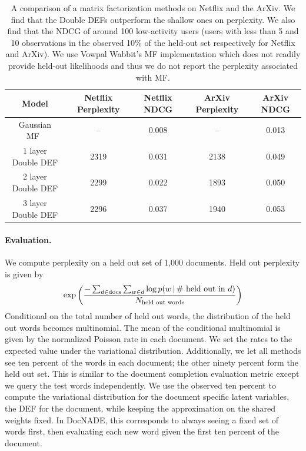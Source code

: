 \documentclass[twoside]{article}
\begin{document}
\begin{table}
\centering
\begin{tabular}{|c | c | c | c | c |}
\hline
Model & Netflix Perplexity & Netflix NDCG & ArXiv Perplexity & ArXiv NDCG  \\
\hline
 Gaussian MF~\cite{Salakhutdinov:2008a}  & -- & 0.008 & --  & 0.013 \\\hline
 1 layer Double DEF & 2319  & 0.031 & 2138  & 0.049 \\ 
 2 layer Double DEF & 2299 & 0.022 & 1893  & 0.050 \\
 3 layer Double DEF & 2296& 0.037  & 1940  & 0.053 \\
\hline
\end{tabular}
\caption{A comparison of a matrix factorization methods on Netflix and the
ArXiv. We find that the Double DEFs outperform the shallow ones on 
perplexity. We also find that 
the NDCG of around 100 low-activity users (users with less than
5 and 10 observations in the observed 10\% of the held-out set respectively for
Netflix and ArXiv). We use Vowpal Wabbit's MF implementation which does not
readily provide held-out likelihoods and thus we do not report the perplexity
associated with MF.}  
\label{tab:movie_results}
\vskip -0.10in
\end{table}

\paragraph{Evaluation.}
We compute perplexity on a held out set of 1,000
documents. Held out perplexity is given by
\begin{align*}
\exp{\left(\frac{-\sum_{d \in \textrm{docs}} \sum_{w \in d} \log p(w \,\vert\,\text{\# held out in } d )}{N_\textrm{held out words}} \right)} 
\end{align*}
Conditional on the total number of held out words, the distribution of the held out words becomes
multinomial. The mean of the conditional multinomial is given by the normalized Poisson
rate in each document. We set the rates to the expected value under the variational distribution.
Additionally, we let all methods see ten percent of the words in each document; the other
ninety percent form the held out set. This is similar to the document completion evaluation
metric \citep{Wallach:2009a} except we query the test words independently.
We use the observed ten percent to compute the variational distribution 
for the document specific latent variables, the DEF for the document, while keeping the approximation on
the shared weights fixed. In DocNADE, this corresponds
to always seeing a fixed set of words first, then evaluating each new word given the first ten 
percent of the document. 
\end{document}
